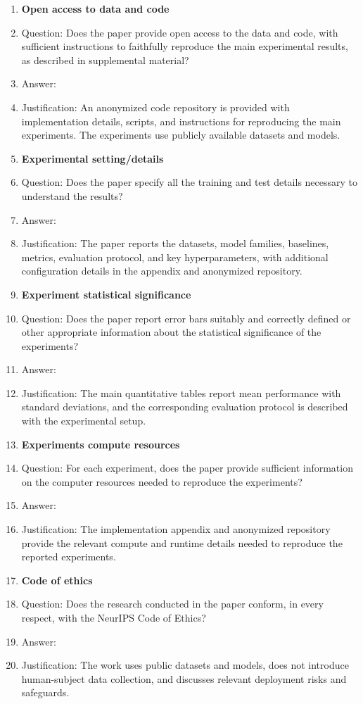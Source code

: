 \begin{enumerate}
\item {\bf Open access to data and code}
    \item[] Question: Does the paper provide open access to the data and code, with sufficient instructions to faithfully reproduce the main experimental results, as described in supplemental material?
    \item[] Answer: \answerYes{}
    \item[] Justification: An anonymized code repository is provided with implementation details, scripts, and instructions for reproducing the main experiments. The experiments use publicly available datasets and models.

\item {\bf Experimental setting/details}
    \item[] Question: Does the paper specify all the training and test details necessary to understand the results?
    \item[] Answer: \answerYes{}
    \item[] Justification: The paper reports the datasets, model families, baselines, metrics, evaluation protocol, and key hyperparameters, with additional configuration details in the appendix and anonymized repository.

\item {\bf Experiment statistical significance}
    \item[] Question: Does the paper report error bars suitably and correctly defined or other appropriate information about the statistical significance of the experiments?
    \item[] Answer: \answerYes{}
    \item[] Justification: The main quantitative tables report mean performance with standard deviations, and the corresponding evaluation protocol is described with the experimental setup.

\item {\bf Experiments compute resources}
    \item[] Question: For each experiment, does the paper provide sufficient information on the computer resources needed to reproduce the experiments?
    \item[] Answer: \answerYes{}
    \item[] Justification: The implementation appendix and anonymized repository provide the relevant compute and runtime details needed to reproduce the reported experiments.

\item {\bf Code of ethics}
    \item[] Question: Does the research conducted in the paper conform, in every respect, with the NeurIPS Code of Ethics?
    \item[] Answer: \answerYes{}
    \item[] Justification: The work uses public datasets and models, does not introduce human-subject data collection, and discusses relevant deployment risks and safeguards.


\end{enumerate}
